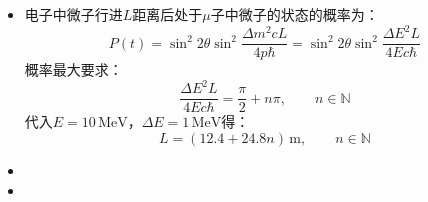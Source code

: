 \documentclass[a4paper,fontset=none]{ctexart}
\begin{document}
\begin{itemize}
        \item[1.]
        电子中微子行进$L$距离后处于$\mu$子中微子的状态的概率为：
        \[
        P(t) = \sin^2{2\theta}\sin^2{\frac{\Delta m^2 cL}{4p\hbar}} = \sin^2{2\theta}\sin^2{\frac{\Delta E^2 L}{4Ec\hbar}}
        \]
        概率最大要求：
        \[
        \frac{\Delta E^2 L}{4Ec\hbar} = \frac{\pi}{2} + n\pi,\qquad n \in \mathbb{N}
        \]
        代入$E = 10\,\mathrm{MeV}$，$\Delta E = 1\,\mathrm{MeV}$得：
        \[
        L = (12.4 + 24.8n)\,\mathrm{m},\qquad n \in \mathbb{N}
        \]

        \item[2.]

        \item[3.]

    \end{itemize}
\end{document}

